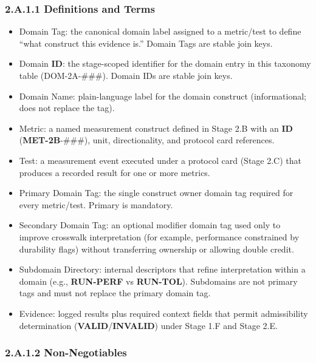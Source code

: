 \documentclass[10pt]{article}
\begin{document}
\subsubsection*{2.A.1.1 Definitions and Terms}

\begin{itemize}
\item Domain Tag: the canonical domain label assigned to a metric/test to define “what construct this evidence is.” Domain Tags are stable join keys.
\item Domain \textbf{ID}: the stage-scoped identifier for the domain entry in this taxonomy table (DOM-2A-\#\#\#). Domain IDs are stable join keys.
\item Domain Name: plain-language label for the domain construct (informational; does not replace the tag).
\item Metric: a named measurement construct defined in Stage 2.B with an \textbf{ID} (\textbf{MET-2B}-\#\#\#), unit, directionality, and protocol card references.
\item Test: a measurement event executed under a protocol card (Stage 2.C) that produces a recorded result for one or more metrics.
\item Primary Domain Tag: the single construct owner domain tag required for every metric/test. Primary is mandatory.
\item Secondary Domain Tag: an optional modifier domain tag used only to improve crosswalk interpretation (for example, performance constrained by durability flags) without transferring ownership or allowing double credit.
\item Subdomain Directory: internal descriptors that refine interpretation within a domain (e.g., \textbf{RUN-PERF} vs \textbf{RUN-TOL}). Subdomains are not primary tags and must not replace the primary domain tag.
\item Evidence: logged results plus required context fields that permit admissibility determination (\textbf{VALID}/\textbf{INVALID}) under Stage 1.F and Stage 2.E.
\end{itemize}

\newpage

\subsubsection*{2.A.1.2 Non-Negotiables}
\end{document}

